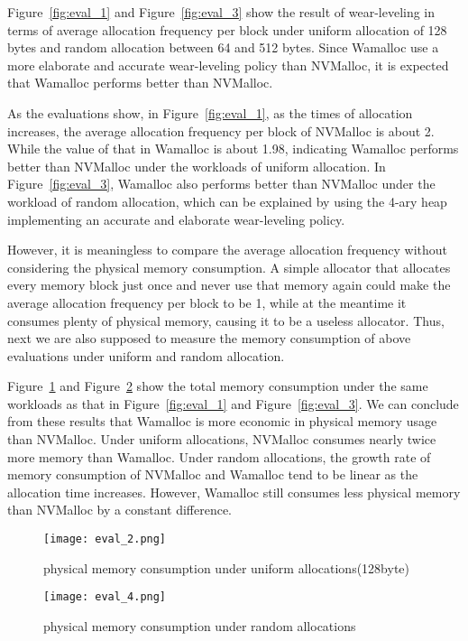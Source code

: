 \documentclass[10pt, conference, compsocconf]{IEEEtran}
\begin{document}
Figure~\ref{fig:eval_1} and Figure~\ref{fig:eval_3} show the result of wear-leveling 
in terms of average allocation frequency per block
under uniform allocation of 128 bytes and random allocation between 64 and 512 bytes.
Since Wamalloc use a more elaborate and accurate wear-leveling policy than NVMalloc,
it is expected that Wamalloc performs better than NVMalloc.

As the evaluations show, in Figure~\ref{fig:eval_1}, as the times of allocation increases,
the average allocation frequency per block of NVMalloc is about 2.
While the value of that in Wamalloc is about 1.98, 
indicating Wamalloc performs better than NVMalloc under the workloads of uniform allocation.
In Figure~\ref{fig:eval_3},
Wamalloc also performs better than NVMalloc under the workload of random allocation,
which can be explained by using the 4-ary heap implementing an accurate and elaborate wear-leveling policy.

However, it is meaningless to compare the average allocation frequency without considering the physical memory consumption.
A simple allocator that allocates every memory block just once and never use that memory again 
could make the average allocation frequency per block to be 1, 
while at the meantime it consumes plenty of physical memory, causing it to be a useless allocator.
Thus, next we are also supposed to measure the memory consumption of above evaluations under uniform and random allocation.

Figure~\ref{fig:eval_2} and Figure~\ref{fig:eval_4} show the total memory consumption under the same workloads 
as that in Figure~\ref{fig:eval_1} and Figure~\ref{fig:eval_3}.
We can conclude from these results that 
Wamalloc is more economic in physical memory usage than NVMalloc.
Under uniform allocations, NVMalloc consumes nearly twice more memory than Wamalloc.
Under random allocations, the growth rate of memory consumption of NVMalloc and Wamalloc tend to be linear 
as the allocation time increases. 
However, Wamalloc still consumes less physical memory than NVMalloc by a constant difference.

\begin{figure}[t]
\centering
\texttt{[image: eval\_2.png]}
\caption{physical memory consumption under uniform allocations(128byte)}
\label{fig:eval_2}
\end{figure}

\begin{figure}[t]
\centering
\texttt{[image: eval\_4.png]}
\caption{physical memory consumption under random allocations}
\label{fig:eval_4}
\end{figure}
\end{document}
